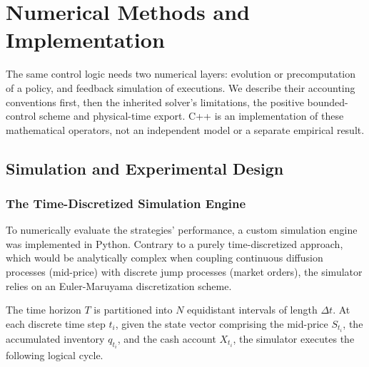 \chapter{Numerical Methods and Implementation}\label{ch:numerics}
The same control logic needs two numerical layers: evolution or precomputation of a policy, and feedback simulation of executions. We describe their accounting conventions first, then the inherited solver's limitations, the positive bounded-control scheme and physical-time export. C++ is an implementation of these mathematical operators, not an independent model or a separate empirical result.
\section{Simulation and Experimental Design}


\subsection{The Time-Discretized Simulation Engine}
To numerically evaluate the strategies' performance, a custom simulation engine was implemented in Python. Contrary to a purely time-discretized approach, which would be analytically complex when coupling continuous diffusion processes (mid-price) with discrete jump processes (market orders), the simulator relies on an Euler-Maruyama discretization scheme.

The time horizon $T$ is partitioned into $N$ equidistant intervals of length $\Delta t$. At each discrete time step $t_i$, given the state vector comprising the mid-price $S_{t_i}$, the accumulated inventory $q_{t_i}$, and the cash account $X_{t_i}$, the simulator executes the following logical cycle.

